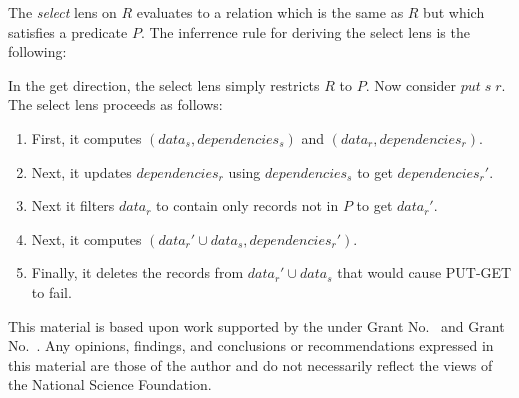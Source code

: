 \documentclass[acmsmall,review,anonymous]{acmart}\settopmatter{printfolios=true,printccs=false,printacmref=false}
\theoremstyle{definition}
\begin{document}
The {\em select} lens on $R$ evaluates to a relation which is the same as $R$
but which satisfies a predicate $P$. The inferrence rule for deriving the select
lens is the following:
\begin{prooftree}
\end{prooftree}
In the get direction, the select lens simply restricts $R$ to $P$. Now consider
$put \; s \; r$. The select lens proceeds as follows:
\begin{enumerate}
  \item
  First, it computes $(data_s, dependencies_s)$ and $(data_r, dependencies_r)$.
  \item
  Next, it updates $dependencies_r$ using $dependencies_s$ to get
  $dependencies_r'$.
  \item
  Next it filters $data_r$ to contain only records not in $P$ to get $data_r'$.
  \item
  Next, it computes $(data_r' \cup data_s, dependencies_r')$.
  \item
  Finally, it deletes the records from $data_r' \cup data_s$ that would cause
  PUT-GET to fail.
\end{enumerate}
\fi
\begin{acks}                            %
This material is based upon work supported by the
 under Grant
No.~ and Grant
No.~.  Any opinions, findings, and
conclusions or recommendations expressed in this material are those
of the author and do not necessarily reflect the views of the
National Science Foundation.
\end{acks}



\end{document}
